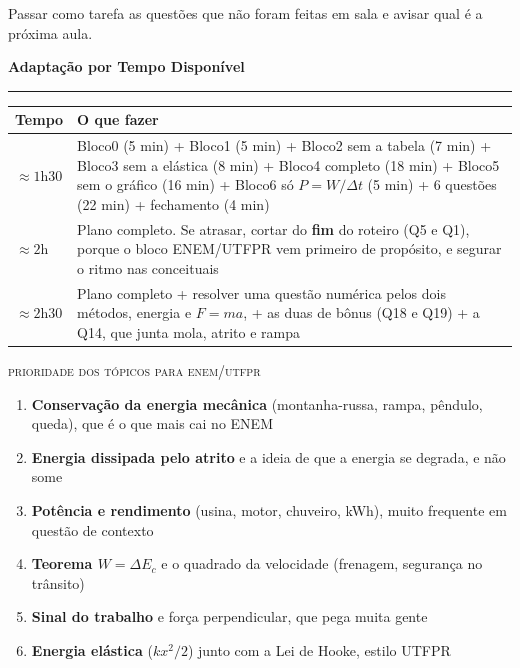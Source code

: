 \documentclass[11pt,a4paper]{article}
\newcommand{\secao}[1]{%
  \needspace{6\baselineskip}
  \vspace{1.8em}
  {\Large\bfseries #1}\\[-0.55em]
  {\color{black!30}\rule{\linewidth}{0.5pt}}
  \par\nobreak\smallskip
}
\begin{document}
\begin{obs}
Passar como tarefa as quest\~oes que n\~ao foram feitas em sala e
avisar qual \'e a pr\'oxima aula.
\end{obs}

\secao{Adapta\c{c}\~ao por Tempo Dispon\'ivel}

{\renewcommand{\arraystretch}{1.5}
\begin{tabularx}{\linewidth}{@{}lX@{}}
  \toprule
  \textbf{Tempo} & \textbf{O que fazer} \\
  \midrule
  $\approx 1$h30 &
    Bloco0 (5 min) + Bloco1 (5 min) + Bloco2 sem a tabela (7 min) +
    Bloco3 sem a el\'astica (8 min) + Bloco4 completo (18 min) +
    Bloco5 sem o gr\'afico (16 min) + Bloco6 s\'o $P = W/\Delta t$
    (5 min) + 6 quest\~oes (22 min) + fechamento (4 min) \\
  $\approx 2$h &
    Plano completo. Se atrasar, cortar do \textbf{fim} do roteiro
    (Q5 e Q1), porque o bloco ENEM/UTFPR vem primeiro de prop\'osito,
    e segurar o ritmo nas conceituais \\
  $\approx 2$h30 &
    Plano completo + resolver uma quest\~ao num\'erica pelos dois
    m\'etodos, energia e $F = ma$, + as duas de b\^onus (Q18 e Q19) +
    a Q14, que junta mola, atrito e rampa \\
  \bottomrule
\end{tabularx}}

\bigskip

{\scshape\color{vinho}prioridade dos t\'opicos para enem/utfpr}
\begin{enumerate}[nosep]
  \item \textbf{Conserva\c{c}\~ao da energia mec\^anica} (montanha-russa,
        rampa, p\^endulo, queda), que \'e o que mais cai no ENEM
  \item \textbf{Energia dissipada pelo atrito} e a ideia de que a
        energia se degrada, e n\~ao some
  \item \textbf{Pot\^encia e rendimento} (usina, motor, chuveiro, kWh),
        muito frequente em quest\~ao de contexto
  \item \textbf{Teorema $W = \Delta E_c$} e o quadrado da velocidade
        (frenagem, seguran\c{c}a no tr\^ansito)
  \item \textbf{Sinal do trabalho} e for\c{c}a perpendicular, que pega
        muita gente
  \item \textbf{Energia el\'astica} ($kx^2/2$) junto com a Lei de
        Hooke, estilo UTFPR
\end{enumerate}
\end{document}
